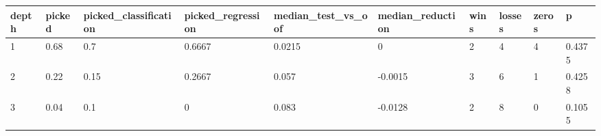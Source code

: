 \begin{tabular}{llllllllll}
\toprule
depth & picked & picked\_classification & picked\_regression & median\_test\_vs\_oof & median\_reduction & wins & losses & zeros & p \\
\midrule
1 & 0.68 & 0.7 & 0.6667 & 0.0215 & 0 & 2 & 4 & 4 & 0.4375 \\
2 & 0.22 & 0.15 & 0.2667 & 0.057 & -0.0015 & 3 & 6 & 1 & 0.4258 \\
3 & 0.04 & 0.1 & 0 & 0.083 & -0.0128 & 2 & 8 & 0 & 0.1055 \\
\bottomrule
\end{tabular}
